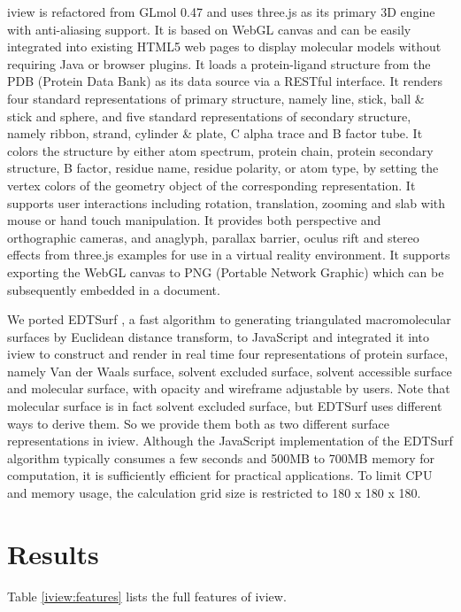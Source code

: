 iview is refactored from GLmol 0.47 and uses three.js as its primary 3D engine with anti-aliasing support. It is based on WebGL canvas and can be easily integrated into existing HTML5 web pages to display molecular models without requiring Java or browser plugins. It loads a protein-ligand structure from the PDB (Protein Data Bank) \citep{1357} as its data source via a RESTful interface. It renders four standard representations of primary structure, namely line, stick, ball \& stick and sphere, and five standard representations of secondary structure, namely ribbon, strand, cylinder \& plate, C alpha trace and B factor tube. It colors the structure by either atom spectrum, protein chain, protein secondary structure, B factor, residue name, residue polarity, or atom type, by setting the vertex colors of the geometry object of the corresponding representation. It supports user interactions including rotation, translation, zooming and slab with mouse or hand touch manipulation. It provides both perspective and orthographic cameras, and anaglyph, parallax barrier, oculus rift and stereo effects from three.js examples for use in a virtual reality environment. It supports exporting the WebGL canvas to PNG (Portable Network Graphic) which can be subsequently embedded in a document.

We ported EDTSurf \citep{1297,1350}, a fast algorithm to generating triangulated macromolecular surfaces by Euclidean distance transform, to JavaScript and integrated it into iview to construct and render in real time four representations of protein surface, namely Van der Waals surface, solvent excluded surface, solvent accessible surface and molecular surface, with opacity and wireframe adjustable by users. Note that molecular surface is in fact solvent excluded surface, but EDTSurf uses different ways to derive them. So we provide them both as two different surface representations in iview. Although the JavaScript implementation of the EDTSurf algorithm typically consumes a few seconds and 500MB to 700MB memory for computation, it is sufficiently efficient for practical applications. To limit CPU and memory usage, the calculation grid size is restricted to 180 x 180 x 180.

\section{Results}

Table \ref{iview:features} lists the full features of iview.

